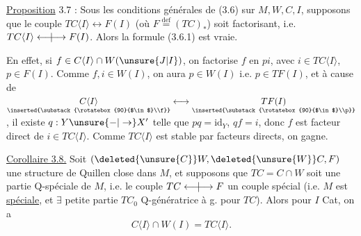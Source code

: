 \uline{Proposition} 3.7 :  Sous les conditions générales de
(3.6) sur $M,W,C,I$, supposons que le
couple $TC\langle I\rangle\longleftrightarrow F(I)$ (où $F\overset{\mathrm{def}}{=}(TC)_*$)
soit factorisant, i.e. $TC\langle I\rangle\mathrel{\longleftarrow\mkern-9mu|\mkern-9mu\longrightarrow}F(I)$.
Alors la formule (3.6.1) est vraie.

En effet, si $f\in C\langle I\rangle\cap W(\unsure{J|I})$, on factorise $f$ en $pi$, avec
$i\in TC\langle I\rangle$, $p\in F(I)$. Comme
$f,i\in W(I)$, on aura
$p\in W(I)$ i.e. $p\in TF(I)$,
et à cause de $\underset{\inserted{\substack{\rotatebox{90}{$\in$}\\f}}}{C\langle I\rangle}\longleftrightarrow
\underset{\inserted{\substack{\rotatebox{90}{$\in$}\\p}}}{TF(I)}$,
il existe $q:Y\unsure{-|\to}X'$ telle que $pq=\mathrm{id}_Y$,
$qf=i$, donc $f$ est facteur direct de
$i\in TC\langle I\rangle$. Comme $TC\langle I\rangle$ est stable
par facteurs directs, on gagne.

\uline{Corollaire 3.8.} Soit $(\deleted{\unsure{C}}W,\deleted{\unsure{W}}C,F)$ une structure de
Quillen close dans $M$, et supposons que
$TC=C\cap W$ soit une partie Q-spéciale de $M$,
i.e. le couple $TC\mathrel{\longleftarrow\mkern-9mu|\mkern-9mu\longrightarrow}F$ un couple
spécial (i.e. $M$ est \uline{spéciale}, et $\exists$ petite
partie $TC_0$ Q-génératrice à g. pour $TC$).
Alors pour  $I$  Cat, on a
\[
 C\langle I\rangle\cap W(I)=TC\langle I\rangle.\tag*{(3.8.1)}
\]

